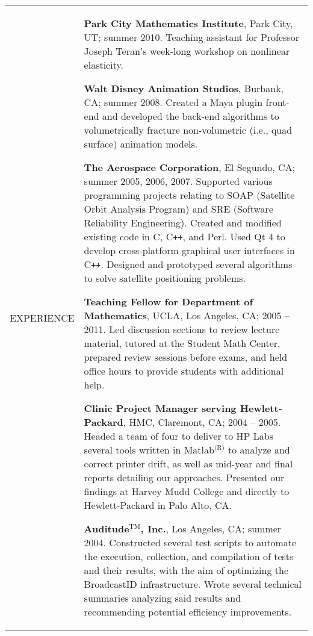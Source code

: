 \documentclass{article}
\begin{document}
\begin{center}
\vspace{\VS}

\begin{tabular}{@{}p{\CWa\columnwidth}@{}p{\CWb\columnwidth}@{}}
{\small EXPERIENCE} &
\begin{minipage}[t]{\CWb\columnwidth}
\par \textbf{Park City Mathematics Institute}, Park City, UT; summer 2010. Teaching assistant for Professor Joseph Teran's week-long workshop on nonlinear elasticity.
\par \textbf{Walt Disney Animation Studios}, Burbank, CA; summer 2008. Created a Maya plugin front-end and developed the back-end algorithms to volumetrically fracture non-volumetric (i.e., quad surface) animation models.
\vspace{\VSEX}
\par \textbf{The Aerospace Corporation}, El Segundo, CA; summer 2005, 2006, 2007. Supported various programming projects relating to SOAP (Satellite Orbit Analysis Program) and SRE (Software Reliability Engineering). Created and modified existing code in C, C{\tt ++}, and Perl. Used Qt 4 to develop cross-platform graphical user interfaces in C{\tt ++}. Designed and prototyped several algorithms to solve satellite positioning problems.
\vspace{\VSEX}
\par \textbf{Teaching Fellow for Department of Mathematics}, UCLA, Los Angeles, CA; 2005 -- 2011. Led discussion sections to review lecture material, tutored at the Student Math Center, prepared review sessions before exams, and held office hours to provide students with additional help. %
\vspace{\VSEX}
\par \textbf{Clinic Project Manager serving Hewlett-Packard}, HMC, Claremont, CA; 2004 -- 2005. Headed a team of four to deliver to HP Labs several tools written in Matlab$^{\text{(R)}}$ to analyze and correct printer drift, as well as mid-year and final reports detailing our approaches. Presented our findings at Harvey Mudd College and directly to Hewlett-Packard in Palo Alto, CA.
\vspace{\VSEX}
\par \textbf{Auditude$^{\text{TM}}$, Inc.}, Los Angeles, CA; summer 2004. Constructed several test scripts to automate the execution, collection, and compilation of tests and their results, with the aim of optimizing the BroadcastID infrastructure. Wrote several technical summaries analyzing said results and recommending potential efficiency improvements.

\end{minipage}
\end{tabular}
\end{center}
\end{document}
